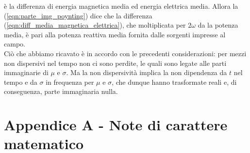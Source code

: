 \documentclass{book}
\begin{document}
        è la differenza di energia magnetica media ed energia elettrica media. Allora la (\ref{eqn:parte_img_poynting})
        dice che la differenza (\ref{eqn:diff_media_magnetica_elettrica}), che moltiplicata per $2 \omega$ da la potenza media, è
        pari alla potenza reattiva media fornita dalle sorgenti impresse al campo.
        \\ Ciò che abbiamo ricavato è in accordo con le precedenti considerazioni: per mezzi non dispersivi nel tempo
        non ci sono perdite, le quali sono legate alle parti immaginarie di $\mu$ e $\sigma$. Ma la non dispersività implica la
        non dipendenza da $t$ nel tempo e da $\sigma$ in frequenza per $\mu$ e $\sigma$, che dunque hanno trasformate reali e, di conseguenza,
        parte immaginaria nulla.
        


\chapter*{Appendice A - Note di carattere matematico}
\end{document}
